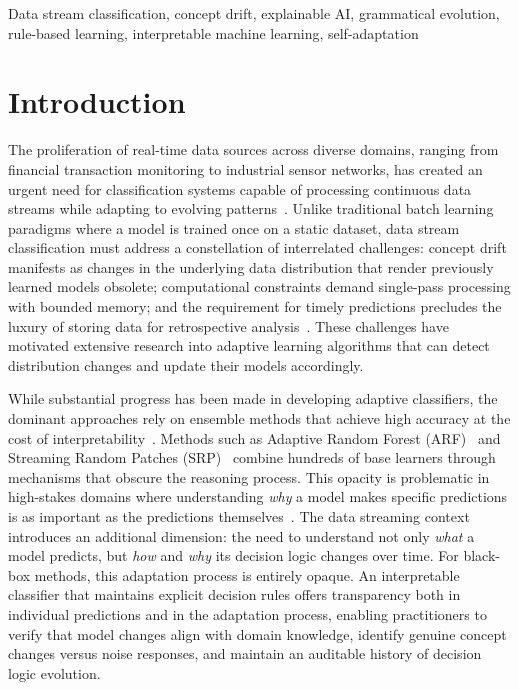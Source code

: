 \documentclass[lettersize,journal]{IEEEtran}
\begin{document}
\begin{IEEEkeywords}
Data stream classification, concept drift, explainable AI, grammatical evolution, rule-based learning, interpretable machine learning, self-adaptation
\end{IEEEkeywords}

\section{Introduction}
\label{sec:introduction}

The proliferation of real-time data sources across diverse domains, ranging from financial transaction monitoring to industrial sensor networks, has created an urgent need for classification systems capable of processing continuous data streams while adapting to evolving patterns~\cite{gama2014survey}. Unlike traditional batch learning paradigms where a model is trained once on a static dataset, data stream classification must address a constellation of interrelated challenges: concept drift manifests as changes in the underlying data distribution that render previously learned models obsolete; computational constraints demand single-pass processing with bounded memory; and the requirement for timely predictions precludes the luxury of storing data for retrospective analysis~\cite{bifet2010moa}. These challenges have motivated extensive research into adaptive learning algorithms that can detect distribution changes and update their models accordingly.

While substantial progress has been made in developing adaptive classifiers, the dominant approaches rely on ensemble methods that achieve high accuracy at the cost of interpretability~\cite{gomes2017adaptive}. Methods such as Adaptive Random Forest (ARF)~\cite{gomes2017adaptive} and Streaming Random Patches (SRP)~\cite{gomes2019streaming} combine hundreds of base learners through mechanisms that obscure the reasoning process. This opacity is problematic in high-stakes domains where understanding \textit{why} a model makes specific predictions is as important as the predictions themselves~\cite{rudin2019stop}. The data streaming context introduces an additional dimension: the need to understand not only \textit{what} a model predicts, but \textit{how} and \textit{why} its decision logic changes over time. For black-box methods, this adaptation process is entirely opaque. An interpretable classifier that maintains explicit decision rules offers transparency both in individual predictions and in the adaptation process, enabling practitioners to verify that model changes align with domain knowledge, identify genuine concept changes versus noise responses, and maintain an auditable history of decision logic evolution.
\end{document}
